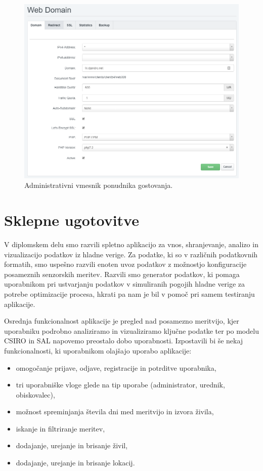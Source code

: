 \documentclass[a4paper, 12pt]{book}
\begin{document}
\begin{figure}[h]
\begin{center}
\includegraphics[width=\textwidth]{slike/admin_vmesnik.png}
\end{center}
\caption{Administrativni vmesnik ponudnika gostovanja.}
\label{ss-admim-gui}
\end{figure}



\chapter{Sklepne ugotovitve}

V diplomskem delu smo razvili spletno aplikacijo za vnos, shranjevanje, analizo in vizualizacijo podatkov iz hladne verige. Za podatke, ki so v različnih podatkovnih formatih, smo uspešno razvili enoten uvoz podatkov z možnostjo konfiguracije posameznih senzorskih meritev. Razvili smo generator podatkov, ki pomaga uporabnikom pri ustvarjanju podatkov v simuliranih pogojih hladne verige za potrebe optimizacije procesa, hkrati pa nam je bil v pomoč pri samem testiranju aplikacije. 

Osrednja funkcionalnost aplikacije je pregled nad posamezno meritvijo, kjer uporabniku podrobno analiziramo in vizualiziramo ključne podatke ter po modelu CSIRO in SAL napovemo preostalo dobo uporabnosti. Izpostavili bi še nekaj funkcionalnosti, ki uporabnikom olajšajo uporabo aplikacije:

\begin{itemize}
	\item omogočanje prijave, odjave, registracije in potrditve uporabnika,
	\item tri uporabniške vloge glede na tip uporabe (administrator, urednik, obiskovalec),
	\item možnost spreminjanja števila dni med meritvijo in izvora živila,
	\item iskanje in filtriranje meritev,
	\item dodajanje, urejanje in brisanje živil,
	\item dodajanje, urejanje in brisanje lokacij.
\end{itemize}
\end{document}
